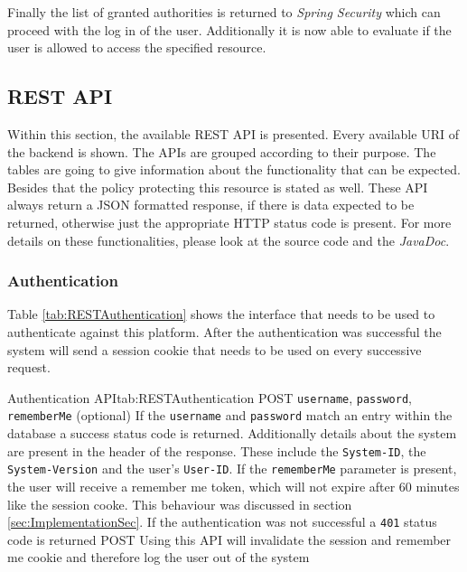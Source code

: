 Finally the list of granted authorities is returned to \emph{Spring Security} which can proceed with the log in of the user. Additionally it is now able to evaluate if the user is allowed to access the specified resource.

\subsection{REST API}
\label{sec:REST}

Within this section, the available \gls{REST} \gls{API} is presented. Every available \gls{URI} of the backend is shown. The \gls{API}s are grouped according to their purpose. The tables are going to give information about the functionality that can be expected. Besides that the policy protecting this resource is stated as well. These \gls{API} always return a \gls{JSON} formatted response, if there is data expected to be returned, otherwise just the appropriate HTTP status code is present. For more details on these functionalities, please look at the source code and the \emph{JavaDoc}.

\subsubsection{Authentication}

Table \vref{tab:RESTAuthentication} shows the interface that needs to be used to authenticate against this platform. After the authentication was successful the system will send a session cookie that needs to be used on every successive request.

\begin{RESTTable}{Authentication API}{tab:RESTAuthentication}
		{POST}
		{\texttt{username}, \texttt{password}, \texttt{rememberMe} (optional)}
		{If the \texttt{username} and \texttt{password} match an entry within the database a success status code is returned. Additionally details about the system are present in the header of the response. These include the \texttt{System-ID}, the \texttt{System-Version} and the user's \texttt{User-ID}. If the \texttt{rememberMe} parameter is present, the user will receive a remember me token, which will not expire after 60 minutes like the session cooke. This behaviour was discussed in section \vref{sec:ImplementationSec}. If the authentication was not successful a \texttt{401} status code is returned}
		{POST}
		{}
		{Using this \gls{API} will invalidate the session and remember me cookie and therefore log the user out of the system}
\end{RESTTable}



